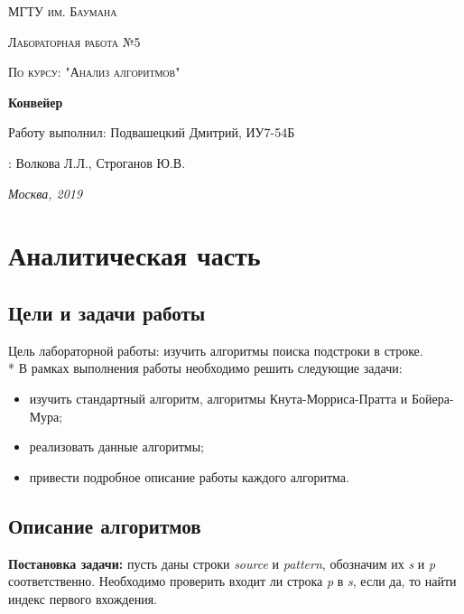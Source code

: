 \documentclass[12pt]{report}
\begin{document}
	
	\begin{titlepage}
		\centering
		{\scshape\LARGE МГТУ им. Баумана \par}
		\vspace{3cm}
		{\scshape\Large Лабораторная работа №5\par}
		\vspace{0.5cm}	
		{\scshape\Large По курсу: "Анализ алгоритмов"\par}
		\vspace{1.5cm}
		{\huge\bfseries Конвейер\par}
		\vspace{2cm}
		\Large Работу выполнил: Подвашецкий Дмитрий, ИУ7-54Б\par
		\vspace{0.5cm}
		:  Волкова Л.Л., Строганов Ю.В.\par
		
		\vfill
		\large \textit {Москва, 2019} \par
	\end{titlepage}
	
	\tableofcontents


	\chapter{Аналитическая часть}
	\section{Цели и задачи работы}


Цель лабораторной работы: изучить алгоритмы поиска подстроки в строке. \\*
В рамках выполнения работы необходимо решить следующие задачи:
\begin{itemize}
	\item изучить стандартный алгоритм, алгоритмы Кнута-Морриса-Пратта и Бойера-Мура;
	\item реализовать данные алгоритмы;
	\item привести подробное описание работы каждого алгоритма.
\end{itemize}


	\section{Описание алгоритмов}


\textbf{Постановка задачи:} пусть даны строки \textit{source} и \textit{pattern}, обозначим их \textit{s} и \textit{p} соответственно.  
Необходимо проверить входит ли строка \textit{p} в \textit{s}, если да, то найти индекс первого вхождения.
\end{document}
